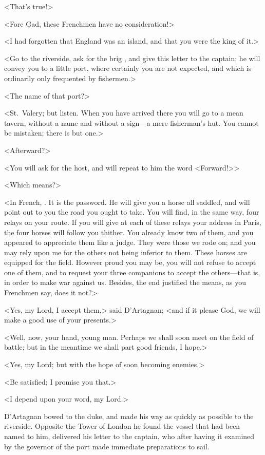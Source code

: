 <That's true!> 

<Fore Gad, these Frenchmen have no consideration!> 

<I had forgotten that England was an island, and that you were the king of it.> 

<Go to the riverside, ask for the brig , and give this letter to the captain; he will convey you to a little port, where certainly you are not expected, and which is ordinarily only frequented by fishermen.> 

<The name of that port?> 

<St.~Valery; but listen. When you have arrived there you will go to a mean tavern, without a name and without a sign—a mere fisherman's hut. You cannot be mistaken; there is but one.> 

<Afterward?> 

<You will ask for the host, and will repeat to him the word <Forward!>> 

<Which means?> 

<In French, . It is the password. He will give you a horse all saddled, and will point out to you the road you ought to take. You will find, in the same way, four relays on your route. If you will give at each of these relays your address in Paris, the four horses will follow you thither. You already know two of them, and you appeared to appreciate them like a judge. They were those we rode on; and you may rely upon me for the others not being inferior to them. These horses are equipped for the field. However proud you may be, you will not refuse to accept one of them, and to request your three companions to accept the others—that is, in order to make war against us. Besides, the end justified the means, as you Frenchmen say, does it not?> 

<Yes, my Lord, I accept them,> said D'Artagnan; <and if it please God, we will make a good use of your presents.> 

<Well, now, your hand, young man. Perhaps we shall soon meet on the field of battle; but in the meantime we shall part good friends, I hope.> 

<Yes, my Lord; but with the hope of soon becoming enemies.> 

<Be satisfied; I promise you that.> 

<I depend upon your word, my Lord.> 

D'Artagnan bowed to the duke, and made his way as quickly as possible to the riverside. Opposite the Tower of London he found the vessel that had been named to him, delivered his letter to the captain, who after having it examined by the governor of the port made immediate preparations to sail. 


